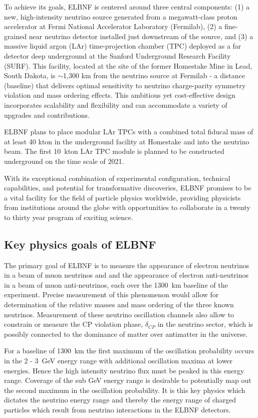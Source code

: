 To achieve its goals, ELBNF is centered around three central components: (1) a new, high-intensity neutrino source generated from a megawatt-class proton accelerator at Fermi National Accelerator Laboratory (Fermilab), (2) a fine-grained near neutrino detector installed just downstream of the source, and (3) a massive liquid argon (LAr) time-projection chamber (TPC) deployed as a far detector deep underground at the Sanford Underground Research Facility (SURF). This facility, located at the site of the former Homestake Mine in Lead, South Dakota, is $\sim$1,300 km from the neutrino source at Fermilab - a distance (baseline) that delivers optimal sensitivity to neutrino charge-parity symmetry violation and mass ordering effects. This ambitious yet cost-effective design incorporates scalability and flexibility and can accommodate a variety of upgrades and contributions.

ELBNF plans to place modular LAr TPCs with a combined total fiducal mass of at least  40 kton in the underground facility at Homestake and into the neutrino beam.
The first 10~kton LAr TPC module is planned to be constructed underground on the time scale of 2021.

With its exceptional combination of experimental configuration, technical capabilities, and potential for transformative discoveries, ELBNF promises to be a vital facility for the field of particle physics worldwide, providing physicists from institutions around the globe with opportunities to collaborate in a twenty to thirty year program of exciting science.



\subsection{Key physics goals of ELBNF}


The primary goal of ELBNF  is to measure the appearance of electron neutrinos in a beam of muon neutrinos and 
and the appearance of electron anti-neutrinos in a beam of muon anti-neutrinos, each
 over the 1300~km baseline of the experiment. Precise measurement of this
phenomenon would allow for determination of the relative masses and mass ordering of the three
known neutrinos. Measurement of these neutrino oscillation channels also allow to constrain or measure the
CP violation phase, $\delta_{CP}$ in the neutrino sector, which is possibly connected to the dominance of matter
over antimatter in the universe.

For a baseline of 1300~km the first maximum of the oscillation probability occurs in the 2 - 3~GeV energy range with additional  
oscillation maxima at lower energies. Hence the high intensity neutrino flux must be peaked in this energy range. Coverage of the 
sub GeV energy range is desirable to potentially map out the second maximum in the oscillation probability.
It is this key physics which dictates the neutrino energy range and thereby the energy range of charged particles which result from neutrino 
interactions in the ELBNF detectors. 


